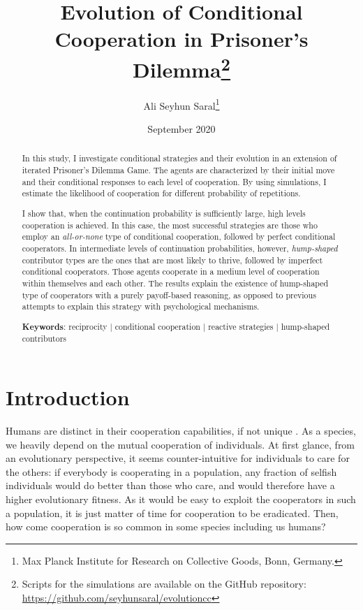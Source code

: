 \documentclass[12pt]{article}
\title{Evolution of Conditional Cooperation in Prisoner's Dilemma\footnote{Scripts for the simulations are available on the GitHub repository: \url{https://github.com/seyhunsaral/evolutioncc}}}
\author{Ali Seyhun Saral\thanks{Max Planck Institute for Research on Collective Goods, Bonn, Germany.}}
\date{September 2020}
\begin{document}
\onehalfspacing
\sloppy
\maketitle        
\begin{abstract}

\thispagestyle{plain}


In this study, I investigate conditional strategies and their evolution in an extension of iterated Prisoner's Dilemma Game. The agents are characterized by their initial move and their conditional responses to each level of cooperation. By using simulations, I estimate the likelihood of cooperation for different probability of repetitions.

I show that, when the continuation probability is sufficiently large, high levels cooperation is achieved. In this case, the most successful strategies are those who employ an \textit{all-or-none} type of conditional cooperation, followed by perfect conditional cooperators. In intermediate levels of continuation probabilities, however, \textit{hump-shaped} contributor types are the ones that are most likely to thrive, followed by imperfect conditional cooperators. Those agents cooperate in a medium level of cooperation within themselves and each other. The results explain the existence of hump-shaped type of cooperators with a purely payoff-based reasoning, as opposed to previous attempts to explain this strategy with psychological mechanisms. 

\textbf{Keywords}: reciprocity | conditional cooperation | reactive strategies | hump-shaped contributors 
\end{abstract}

\section{Introduction} 
Humans are distinct in their cooperation capabilities, if not unique \citep[See][]{Bowles2011,Wilson2012}. As a species, we heavily depend on the mutual cooperation of individuals. At first glance, from an evolutionary perspective, it seems counter-intuitive for  individuals to care for the others: if everybody is cooperating in a population, any fraction of selfish individuals would do better than those who care, and would therefore have a higher evolutionary fitness. As it would be easy to exploit the cooperators in such a population, it is just matter of time for cooperation to be eradicated. Then, how come cooperation is so common in some species including us humans?
\end{document}
